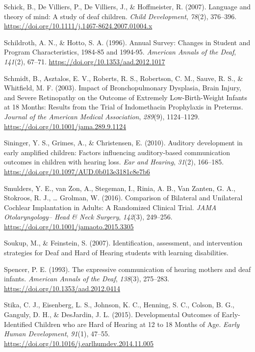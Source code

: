 \documentclass[english,man]{apa6}
\begin{document}
\leavevmode\hypertarget{ref-schick2007}{}%
Schick, B., De Villiers, P., De Villiers, J., \& Hoffmeister, R. (2007). Language and theory of mind: A study of deaf children. \emph{Child Development}, \emph{78}(2), 376--396. \url{https://doi.org/10.1111/j.1467-8624.2007.01004.x}

\leavevmode\hypertarget{ref-schildroth1996}{}%
Schildroth, A. N., \& Hotto, S. A. (1996). Annual Survey: Changes in Student and Program Characteristics, 1984-85 and 1994-95. \emph{American Annals of the Deaf}, \emph{141}(2), 67--71. \url{https://doi.org/10.1353/aad.2012.1017}

\leavevmode\hypertarget{ref-schmidt2003}{}%
Schmidt, B., Asztalos, E. V., Roberts, R. S., Robertson, C. M., Sauve, R. S., \& Whitfield, M. F. (2003). Impact of Bronchopulmonary Dysplasia, Brain Injury, and Severe Retinopathy on the Outcome of Extremely Low-Birth-Weight Infants at 18 Months: Results from the Trial of Indomethacin Prophylaxis in Preterms. \emph{Journal of the American Medical Association}, \emph{289}(9), 1124--1129. \url{https://doi.org/10.1001/jama.289.9.1124}

\leavevmode\hypertarget{ref-sininger2010}{}%
Sininger, Y. S., Grimes, A., \& Christensen, E. (2010). Auditory development in early amplified children: Factors influencing auditory-based communication outcomes in children with hearing loss. \emph{Ear and Hearing}, \emph{31}(2), 166--185. \url{https://doi.org/10.1097/AUD.0b013e3181c8e7b6}

\leavevmode\hypertarget{ref-smulders2016}{}%
Smulders, Y. E., van Zon, A., Stegeman, I., Rinia, A. B., Van Zanten, G. A., Stokroos, R. J., \ldots{} Grolman, W. (2016). Comparison of Bilateral and Unilateral Cochlear Implantation in Adults: A Randomized Clinical Trial. \emph{JAMA Otolaryngology-- Head \& Neck Surgery}, \emph{142}(3), 249--256. \url{https://doi.org/10.1001/jamaoto.2015.3305}

\leavevmode\hypertarget{ref-soukup2007}{}%
Soukup, M., \& Feinstein, S. (2007). Identification, assessment, and intervention strategies for Deaf and Hard of Hearing students with learning disabilities.

\leavevmode\hypertarget{ref-spencer1993}{}%
Spencer, P. E. (1993). The expressive communication of hearing mothers and deaf infants. \emph{American Annals of the Deaf}, \emph{138}(3), 275--283. \url{https://doi.org/10.1353/aad.2012.0414}

\leavevmode\hypertarget{ref-stika2015}{}%
Stika, C. J., Eisenberg, L. S., Johnson, K. C., Henning, S. C., Colson, B. G., Ganguly, D. H., \& DesJardin, J. L. (2015). Developmental Outcomes of Early-Identified Children who are Hard of Hearing at 12 to 18 Months of Age. \emph{Early Human Development}, \emph{91}(1), 47--55. \url{https://doi.org/10.1016/j.earlhumdev.2014.11.005}
\end{document}
